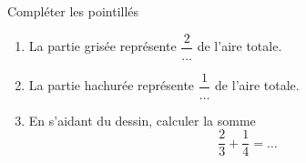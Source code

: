 
\begin{exercice}\label{exo2smath-0037}

Compléter les pointillés
\begin{center}
   
\end{center}
\begin{enumerate}
    \item
        La partie grisée représente \( \dfrac{ 2 }{ \ldots }\) de l'aire totale.
    \item
        La partie hachurée représente \( \dfrac{ 1 }{ \ldots }\) de l'aire totale.
    \item
        En s'aidant du dessin, calculer la somme
        \begin{equation}
            \frac{ 2 }{ 3 }+\frac{1}{ 4 }=\ldots
        \end{equation}
\end{enumerate}

\end{exercice}
